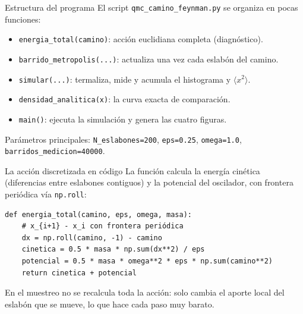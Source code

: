 \documentclass[aspectratio=169, 11pt]{beamer}
\begin{document}
\begin{frame}{Estructura del programa}
  \small
  El script \texttt{qmc\_camino\_feynman.py} se organiza en pocas funciones:

  \vspace{0.2cm}
  \begin{itemize}\setlength\itemsep{4pt}
    \item \texttt{energia\_total(camino)}: acción euclidiana completa (diagnóstico).
    \item \texttt{barrido\_metropolis(...)}: actualiza una vez cada eslabón del camino.
    \item \texttt{simular(...)}: termaliza, mide y acumula el histograma y $\langle x^2\rangle$.
    \item \texttt{densidad\_analitica(x)}: la curva exacta de comparación.
    \item \texttt{main()}: ejecuta la simulación y genera las cuatro figuras.
  \end{itemize}

  \vspace{0.2cm}
  Parámetros principales: \texttt{N\_eslabones=200}, \texttt{eps=0.25},
  \texttt{omega=1.0}, \texttt{barridos\_medicion=40000}.
\end{frame}

\begin{frame}[fragile]{La acción discretizada en código}
  \small
  La función calcula la energía cinética (diferencias entre eslabones contiguos) y
  la potencial del oscilador, con frontera periódica vía \texttt{np.roll}:
  \vspace{0.15cm}
\begin{lstlisting}
def energia_total(camino, eps, omega, masa):
    # x_{i+1} - x_i con frontera periódica
    dx = np.roll(camino, -1) - camino
    cinetica = 0.5 * masa * np.sum(dx**2) / eps
    potencial = 0.5 * masa * omega**2 * eps * np.sum(camino**2)
    return cinetica + potencial
\end{lstlisting}
  \vspace{0.1cm}
  En el muestreo no se recalcula toda la acción: solo cambia el aporte local del
  eslabón que se mueve, lo que hace cada paso muy barato.
\end{frame}
\end{document}
